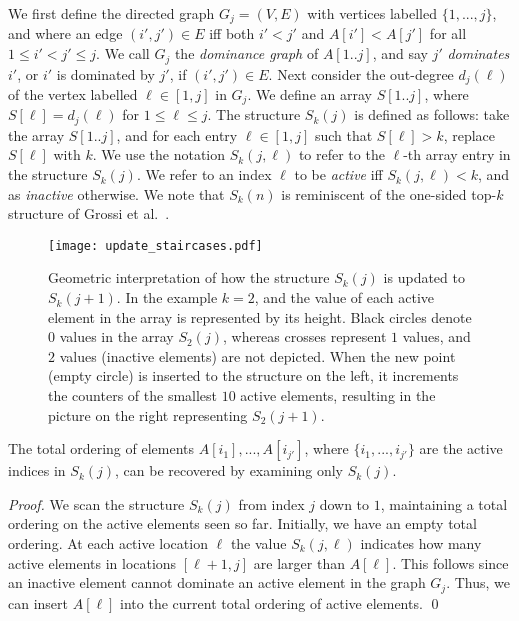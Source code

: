 \documentclass[runningheads]{llncs}
\begin{document}
We first define the directed graph $G_{j} = (V,E)$ with vertices
labelled $\{1, ..., j\}$, and where an edge $(i',j') \in E$ iff both
$i' < j'$ and $A[i'] < A[j']$ for all $1 \le i' < j' \le j$.  We call
$G_{j}$ the \emph{dominance graph} of $A[1..j]$, and say $j'$
\emph{dominates} $i'$, or $i'$ is dominated by $j'$, if $(i',j') \in
E$.  Next consider the out-degree $d_{j}(\ell)$ of the vertex labelled
$\ell \in [1,j]$ in $G_j$. We define an array $S[1..j]$, where
$S[\ell] = d_{j}(\ell)$ for $1 \le \ell \le j$.  The structure
$S_k(j)$ is defined as follows: take the array $S[1..j]$, and for each
entry $\ell \in [1,j]$ such that $S[\ell] > k$, replace $S[\ell]$ with
$k$.  We use the notation $S_k(j,\ell)$ to refer to the $\ell$-th
array entry in the structure $S_k(j)$. We refer to an index $\ell$ to
be \emph{active} iff $S_k(j,\ell) < k$, and as \emph{inactive}
otherwise.  We note that $S_k(n)$ is reminiscent of the one-sided
top-$k$ structure of Grossi et al.~\cite{GINRS13}.

\begin{figure}
\centering
\texttt{[image: update\_staircases.pdf]}
\caption{\label{fig:update}Geometric interpretation of how the
  structure $S_k(j)$ is updated to $S_k(j+1)$.  In the example $k =
  2$, and the value of each active element in the array is represented
  by its height.  Black circles denote $0$ values in the array
  $S_2(j)$, whereas crosses represent $1$ values, and $2$ values
  (inactive elements) are not depicted.  When the new point (empty
  circle) is inserted to the structure on the left, it increments the
  counters of the smallest $10$ active elements, resulting in the
  picture on the right representing $S_2(j+1)$.}
\end{figure}

\begin{lemma}
\label{lem:active}
The total ordering of elements $A[i_1], ..., A[i_{j'}]$,
where $\{i_1, ..., i_{j'}\}$ are the active indices in
$S_k(j)$, can be recovered by examining only $S_k(j)$.
\end{lemma}

\begin{proof}
We scan the structure $S_k(j)$ from index $j$ down to $1$, maintaining
a total ordering on the active elements seen so far.  Initially, we
have an empty total ordering.  At each active location $\ell$ the
value $S_k(j,\ell)$ indicates how many active elements in locations
$[\ell+1,j]$ are larger than $A[\ell]$.  This follows since an
inactive element cannot dominate an active element in the graph
$G_j$. Thus, we can insert $A[\ell]$ into the current total ordering
of active elements. \qed
\end{proof}
\end{document}
